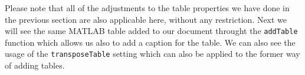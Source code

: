 
Please note that all of the adjustments to the table properties we have done in the previous section are also applicable 
here, without any restriction. Next we will see the same MATLAB table added to our document throught the {\tt addTable} 
function which allows us also to add a caption for the table. We can also see the usage of the {\tt transposeTable} setting
which can also be applied to the former way of adding tables.







